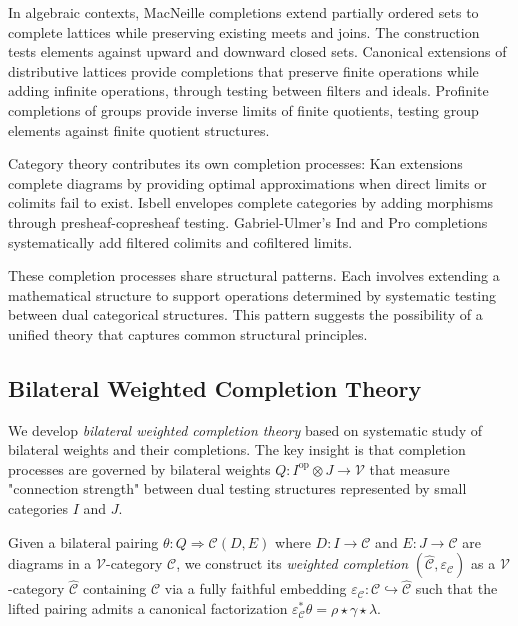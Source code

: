 \documentclass[11pt]{article}
\theoremstyle{plain}
\theoremstyle{definition}
\theoremstyle{remark}
\newcommand{\V}{\mathcal{V}}
\newcommand{\C}{\mathcal{C}}
\newcommand{\op}{\mathrm{op}}
\begin{document}
In algebraic contexts, MacNeille completions \cite{macneille1937extension} extend partially ordered sets to complete lattices while preserving existing meets and joins. The construction tests elements against upward and downward closed sets. Canonical extensions of distributive lattices \cite{jonsson1951boolean} provide completions that preserve finite operations while adding infinite operations, through testing between filters and ideals. Profinite completions \cite{pontryagin1966topological} of groups provide inverse limits of finite quotients, testing group elements against finite quotient structures.

Category theory contributes its own completion processes: Kan extensions \cite{kan1958adjoint} complete diagrams by providing optimal approximations when direct limits or colimits fail to exist. Isbell envelopes \cite{isbell1960adequate} complete categories by adding morphisms through presheaf-copresheaf testing. Gabriel-Ulmer's Ind and Pro completions \cite{gabriel1971categories} systematically add filtered colimits and cofiltered limits.

These completion processes share structural patterns. Each involves extending a mathematical structure to support operations determined by systematic testing between dual categorical structures. This pattern suggests the possibility of a unified theory that captures common structural principles.

\subsection{Bilateral Weighted Completion Theory}

We develop \emph{bilateral weighted completion theory} based on systematic study of bilateral weights and their completions. The key insight is that completion processes are governed by bilateral weights $Q : I^{\op} \otimes J \to \V$ that measure "connection strength" between dual testing structures represented by small categories $I$ and $J$. 

Given a bilateral pairing $\theta : Q \Rightarrow \C(D,E)$ where $D : I \to \C$ and $E : J \to \C$ are diagrams in a $\V$-category $\C$, we construct its \emph{weighted completion} $(\widehat{\C}, \varepsilon_\C)$ as a $\V$-category $\widehat{\C}$ containing $\C$ via a fully faithful embedding $\varepsilon_\C : \C \hookrightarrow \widehat{\C}$ such that the lifted pairing admits a canonical factorization $\varepsilon_\C^* \theta = \rho \star \gamma \star \lambda$.
\end{document}
